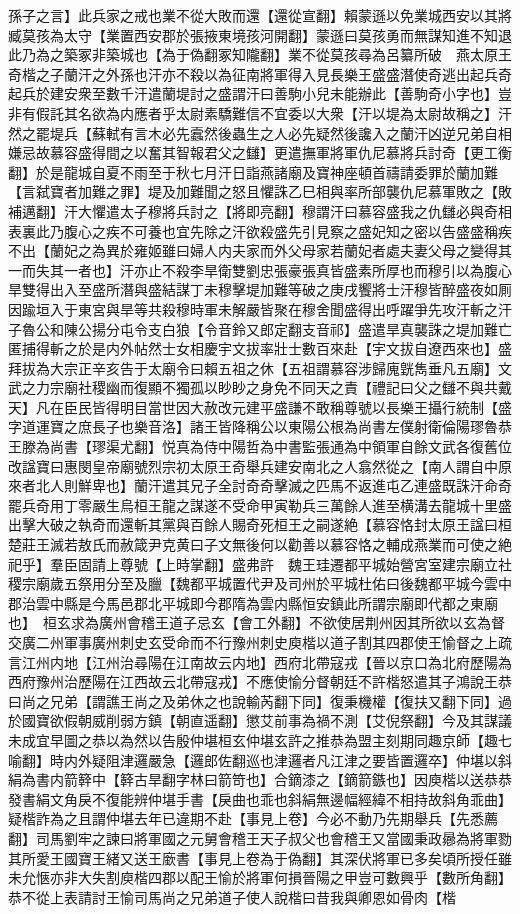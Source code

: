 孫子之言】此兵家之戒也業不從大敗而還【還從宣翻】賴蒙遜以免業城西安以其將臧莫孩為太守【業置西安郡於張掖東境孩河開翻】蒙遜曰莫孩勇而無謀知進不知退此乃為之築冢非築城也【為于偽翻冢知隴翻】業不從莫孩尋為呂纂所破　燕太原王奇楷之子蘭汗之外孫也汗亦不殺以為征南將軍得入見長樂王盛盛潛使奇逃出起兵奇起兵於建安衆至數千汗遣蘭堤討之盛謂汗曰善駒小兒未能辦此【善駒奇小字也】豈非有假託其名欲為内應者乎太尉素驕難信不宜委以大衆【汗以堤為太尉故稱之】汗然之罷堤兵【蘇軾有言木必先蠧然後蟲生之人必先疑然後讒入之蘭汗凶逆兄弟自相嫌忌故慕容盛得間之以奮其智報君父之讎】更遣撫軍將軍仇尼慕將兵討奇【更工衡翻】於是龍城自夏不雨至于秋七月汗日詣燕諸廟及寶神座頓首禱請委罪於蘭加難【言弑寶者加難之罪】堤及加難聞之怒且懼誅乙巳相與率所部襲仇尼慕軍敗之【敗補邁翻】汗大懼遣太子穆將兵討之【將即亮翻】穆謂汗曰慕容盛我之仇讎必與奇相表裏此乃腹心之疾不可養也宜先除之汗欲殺盛先引見察之盛妃知之密以告盛盛稱疾不出【蘭妃之為異於雍姬雖曰婦人内夫家而外父母家若蘭妃者處夫妻父母之變得其一而失其一者也】汗亦止不殺李旱衛雙劉忠張豪張真皆盛素所厚也而穆引以為腹心旱雙得出入至盛所潛與盛結謀丁未穆擊堤加難等破之庚戌饗將士汗穆皆醉盛夜如厠因踰垣入于東宮與旱等共殺穆時軍未解嚴皆聚在穆舍聞盛得出呼躍爭先攻汗斬之汗子魯公和陳公揚分屯令支白狼【令音鈴又郎定翻支音祁】盛遣旱真襲誅之堤加難亡匿捕得斬之於是内外帖然士女相慶宇文拔率壯士數百來赴【宇文拔自遼西來也】盛拜拔為大宗正辛亥告于太廟令曰賴五祖之休【五祖謂慕容涉歸廆皝雋垂凡五廟】文武之力宗廟社稷幽而復顯不獨孤以眇眇之身免不同天之責【禮記曰父之讎不與共戴天】凡在臣民皆得明目當世因大赦改元建平盛謙不敢稱尊號以長樂王攝行統制【盛字道運寶之庶長子也樂音洛】諸王皆降稱公以東陽公根為尚書左僕射衛倫陽璆魯恭王滕為尚書【璆渠尤翻】悦真為侍中陽哲為中書監張通為中領軍自餘文武各復舊位改諡寶曰惠閔皇帝廟號烈宗初太原王奇舉兵建安南北之人翕然從之【南人謂自中原來者北人則鮮卑也】蘭汗遣其兄子全討奇奇擊滅之匹馬不返進屯乙連盛既誅汗命奇罷兵奇用丁零嚴生烏桓王龍之謀遂不受命甲寅勒兵三萬餘人進至横溝去龍城十里盛出擊大破之執奇而還斬其黨與百餘人賜奇死桓王之嗣遂絶【慕容恪封太原王諡曰桓楚莊王滅若敖氏而赦箴尹克黄曰子文無後何以勸善以慕容恪之輔成燕業而可使之絶祀乎】羣臣固請上尊號【上時掌翻】盛弗許　魏王珪遷都平城始營宮室建宗廟立社稷宗廟歲五祭用分至及臘【魏都平城置代尹及司州於平城杜佑曰後魏都平城今雲中郡治雲中縣是今馬邑郡北平城即今郡隋為雲内縣恒安鎮此所謂宗廟即代都之東廟也】　桓玄求為廣州會稽王道子忌玄【會工外翻】不欲使居荆州因其所欲以玄為督交廣二州軍事廣州刺史玄受命而不行豫州刺史庾楷以道子割其四郡使王愉督之上疏言江州内地【江州治尋陽在江南故云内地】西府北帶寇戎【晉以京口為北府歷陽為西府豫州治歷陽在江西故云北帶寇戎】不應使愉分督朝廷不許楷怒遣其子鴻說王恭曰尚之兄弟【謂譙王尚之及弟休之也說輸芮翻下同】復秉機權【復扶又翻下同】過於國寶欲假朝威削弱方鎮【朝直遥翻】懲艾前事為禍不測【艾倪祭翻】今及其謀議未成宜早圖之恭以為然以告殷仲堪桓玄仲堪玄許之推恭為盟主刻期同趣京師【趣七喻翻】時内外疑阻津邏嚴急【邏郎佐翻巡也津邏者凡江津之要皆置邏卒】仲堪以斜絹為書内箭簳中【簳古旱翻字林曰箭笴也】合鏑漆之【鏑箭鏃也】因庾楷以送恭恭發書絹文角戾不復能辨仲堪手書【戾曲也乖也斜絹無邊幅經緯不相持故斜角乖曲】疑楷詐為之且謂仲堪去年已違期不赴【事見上卷】今必不動乃先期舉兵【先悉薦翻】司馬劉牢之諫曰將軍國之元舅會稽王天子叔父也會稽王又當國秉政曏為將軍勠其所愛王國寶王緒又送王廞書【事見上卷為于偽翻】其深伏將軍已多矣頃所授任雖未允愜亦非大失割庾楷四郡以配王愉於將軍何損晉陽之甲豈可數興乎【數所角翻】恭不從上表請討王愉司馬尚之兄弟道子使人說楷曰昔我與卿恩如骨肉【楷